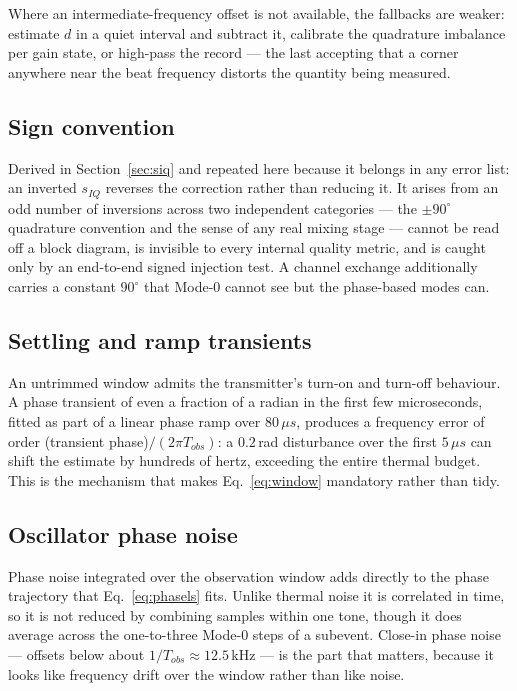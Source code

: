 \documentclass[11pt,a4paper]{article}
\newcommand{\us}{\,\ensuremath{\upmu}s}
\providecommand{\upmu}{\mu}
\begin{document}
Where an intermediate-frequency offset is not available, the fallbacks are weaker: estimate $d$ in a
quiet interval and subtract it, calibrate the quadrature imbalance per gain state, or high-pass the
record --- the last accepting that a corner anywhere near the beat frequency distorts the quantity
being measured.

\subsection{Sign convention}

Derived in Section~\ref{sec:siq} and repeated here because it belongs in any error list: an inverted
$s_{IQ}$ reverses the correction rather than reducing it. It arises from an odd number of inversions
across two independent categories --- the $\pm90^{\circ}$ quadrature convention and the sense of any
real mixing stage --- cannot be read off a block diagram, is invisible to every internal quality
metric, and is caught only by an end-to-end signed injection test. A channel exchange additionally
carries a constant $90^{\circ}$ that Mode-0 cannot see but the phase-based modes can.

\subsection{Settling and ramp transients}

An untrimmed window admits the transmitter's turn-on and turn-off behaviour. A phase transient of
even a fraction of a radian in the first few microseconds, fitted as part of a linear phase ramp over
$80\us$, produces a frequency error of order (transient phase)$/(2\pi T_{obs})$: a $0.2$\,rad
disturbance over the first $5\us$ can shift the estimate by hundreds of hertz, exceeding the entire
thermal budget. This is the mechanism that makes Eq.~\eqref{eq:window} mandatory rather than tidy.

\subsection{Oscillator phase noise}

Phase noise integrated over the observation window adds directly to the phase trajectory that
Eq.~\eqref{eq:phasels} fits. Unlike thermal noise it is correlated in time, so it is not reduced by
combining samples within one tone, though it does average across the one-to-three Mode-0 steps of a
subevent. Close-in phase noise --- offsets below about $1/T_{obs} \approx 12.5$\,kHz --- is the part
that matters, because it looks like frequency drift over the window rather than like noise.
\end{document}
